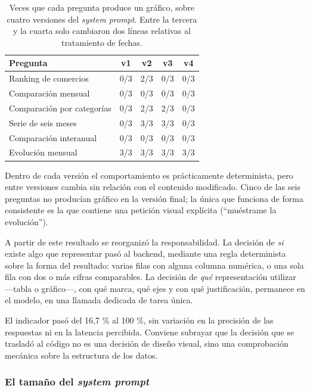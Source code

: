 \begin{table}[h]
\centering
\begin{tabular}{lcccc}
\toprule
\textbf{Pregunta} & \textbf{v1} & \textbf{v2} & \textbf{v3} & \textbf{v4} \\
\midrule
Ranking de comercios          & 0/3 & 2/3 & 0/3 & 0/3 \\
Comparación mensual           & 0/3 & 0/3 & 0/3 & 0/3 \\
Comparación por categorías    & 0/3 & 2/3 & 2/3 & 0/3 \\
Serie de seis meses           & 0/3 & 3/3 & 3/3 & 0/3 \\
Comparación interanual        & 0/3 & 0/3 & 0/3 & 0/3 \\
Evolución mensual             & 3/3 & 3/3 & 3/3 & 3/3 \\
\bottomrule
\end{tabular}
\caption{Veces que cada pregunta produce un gráfico, sobre cuatro versiones del
\textit{system prompt}. Entre la tercera y la cuarta solo cambiaron dos líneas
relativas al tratamiento de fechas.}
\end{table}

Dentro de cada versión el comportamiento es prácticamente determinista, pero
entre versiones cambia sin relación con el contenido modificado. Cinco de las
seis preguntas no producían gráfico en la versión final; la única que funciona
de forma consistente es la que contiene una petición visual explícita
(``muéstrame la evolución'').

A partir de este resultado se reorganizó la responsabilidad. La decisión de
\textit{si} existe algo que representar pasó al backend, mediante una regla
determinista sobre la forma del resultado: varias filas con alguna columna
numérica, o una sola fila con dos o más cifras comparables. La decisión de
\textit{qué} representación utilizar —tabla o gráfico—, con qué marca, qué ejes
y con qué justificación, permanece en el modelo, en una llamada dedicada de
tarea única.

El indicador pasó del 16,7 \% al 100 \%, sin variación en la precisión de las
respuestas ni en la latencia percibida. Conviene subrayar que la decisión que se
trasladó al código no es una decisión de diseño visual, sino una comprobación
mecánica sobre la estructura de los datos.

\subsubsection{El tamaño del \textit{system prompt}}

